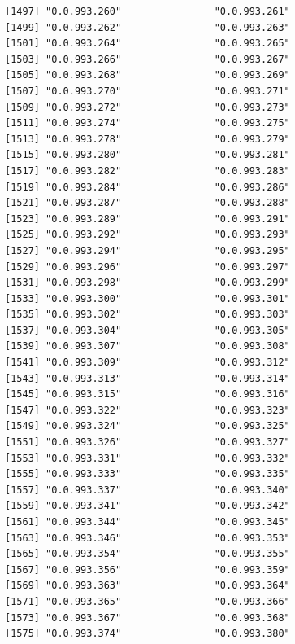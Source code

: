 \documentclass[
  letterpaper,
  DIV=11,
  numbers=noendperiod]{scrreprt}
\begin{document}
\begin{verbatim}
[1497] "0.0.993.260"                "0.0.993.261"               
[1499] "0.0.993.262"                "0.0.993.263"               
[1501] "0.0.993.264"                "0.0.993.265"               
[1503] "0.0.993.266"                "0.0.993.267"               
[1505] "0.0.993.268"                "0.0.993.269"               
[1507] "0.0.993.270"                "0.0.993.271"               
[1509] "0.0.993.272"                "0.0.993.273"               
[1511] "0.0.993.274"                "0.0.993.275"               
[1513] "0.0.993.278"                "0.0.993.279"               
[1515] "0.0.993.280"                "0.0.993.281"               
[1517] "0.0.993.282"                "0.0.993.283"               
[1519] "0.0.993.284"                "0.0.993.286"               
[1521] "0.0.993.287"                "0.0.993.288"               
[1523] "0.0.993.289"                "0.0.993.291"               
[1525] "0.0.993.292"                "0.0.993.293"               
[1527] "0.0.993.294"                "0.0.993.295"               
[1529] "0.0.993.296"                "0.0.993.297"               
[1531] "0.0.993.298"                "0.0.993.299"               
[1533] "0.0.993.300"                "0.0.993.301"               
[1535] "0.0.993.302"                "0.0.993.303"               
[1537] "0.0.993.304"                "0.0.993.305"               
[1539] "0.0.993.307"                "0.0.993.308"               
[1541] "0.0.993.309"                "0.0.993.312"               
[1543] "0.0.993.313"                "0.0.993.314"               
[1545] "0.0.993.315"                "0.0.993.316"               
[1547] "0.0.993.322"                "0.0.993.323"               
[1549] "0.0.993.324"                "0.0.993.325"               
[1551] "0.0.993.326"                "0.0.993.327"               
[1553] "0.0.993.331"                "0.0.993.332"               
[1555] "0.0.993.333"                "0.0.993.335"               
[1557] "0.0.993.337"                "0.0.993.340"               
[1559] "0.0.993.341"                "0.0.993.342"               
[1561] "0.0.993.344"                "0.0.993.345"               
[1563] "0.0.993.346"                "0.0.993.353"               
[1565] "0.0.993.354"                "0.0.993.355"               
[1567] "0.0.993.356"                "0.0.993.359"               
[1569] "0.0.993.363"                "0.0.993.364"               
[1571] "0.0.993.365"                "0.0.993.366"               
[1573] "0.0.993.367"                "0.0.993.368"               
[1575] "0.0.993.374"                "0.0.993.380"               

\end{verbatim}
\end{document}
